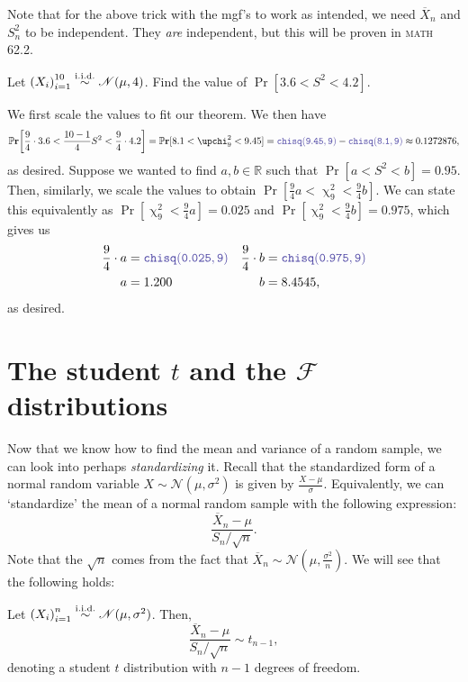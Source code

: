 Note that for the above trick with the mgf's to work as intended, we need \(\overline{X}_n\) and \(S_n^2\) to be independent. 
They \textit{are} independent, but this will be proven in \textsc{math} 62.2. 

\begin{example}
    Let \({(X_i)}_{i=1}^{10} \stackrel{\mathrm{i.i.d.}}{\sim} \mathscr{N}(\mu, 4)\). Find the value of \(\Pr[3.6 < S^2 <4.2]\). 

    We first scale the values to fit our theorem. We then have\[
    \Pr\bigg[\frac{9}{4} \cdot 3.6 < \frac{10-1}{4} S^2 < \frac{9}{4}\cdot 4.2\bigg] = \Pr[8.1 < \upchi_9^2 < 9.45] = \code{chisq(9.45,9)} - \code{chisq(8.1,9)} \approx 0.1272876,
    \]as desired. Suppose we wanted to find \(a,b\in\mathbb{R}\) such that \(\Pr[a<S^2<b] = 0.95\). 
    Then, similarly, we scale the values to obtain \(\Pr[\frac{9}{4} a < \upchi_9^2 <\frac{9}{4} b]\). 
    We can state this equivalently as \(\Pr[\upchi_9^2 < \frac{9}{4}a] = 0.025\) and \(\Pr[\upchi_9^2 < \frac{9}{4}b ] = 0.975\), which gives us\begin{align*}
        \frac{9}{4}\cdot a &= \code{chisq(0.025, 9)} & \frac{9}{4}\cdot b &= \code{chisq(0.975,9)} \\ 
        a & = 1.200 & b&= 8.4545,
    \end{align*}as desired. 
\end{example}

\section{The student \(t\) and the \(\mathscr{F}\) distributions}

Now that we know how to find the mean and variance of a random sample, we can look into perhaps \textit{standardizing} it. 
Recall that the standardized form of a normal random variable \(X\sim\mathscr{N}(\mu, \sigma^2)\) is given by \(\frac{X-\mu}{\sigma}\). 
Equivalently, we can `standardize' the mean of a normal random sample with the following expression:\[
    \frac{\overline{X}_n -\mu}{S_n/\sqrt{n}}. 
\]Note that the \(\sqrt{n}\) comes from the fact that \(\overline{X}_n\sim \mathscr{N}(\mu, \frac{\sigma^2}{n})\).
We will see that the following holds:

\begin{theorem}
    Let \({(X_i)}_{i=1}^n \stackrel{\mathrm{i.i.d.}}{\sim} \mathscr{N}(\mu, \sigma^2)\). Then,\[
        \frac{\overline{X}_n -\mu}{S_n/\sqrt{n}}\sim t_{n-1},
    \]denoting a student \(t\) distribution with \(n-1\) degrees of freedom. 
\end{theorem}

